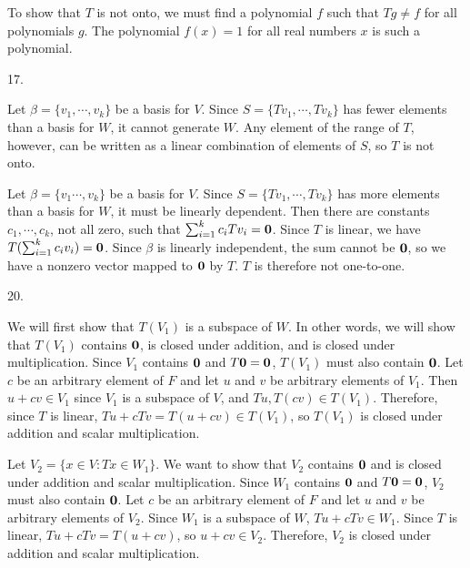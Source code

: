 To show that $T$ is not onto, we must find a polynomial $f$
such that $Tg \ne f$ for all polynomials $g$.
The polynomial $f(x) = 1$ for all real numbers $x$
is such a polynomial.
\bigskip
\item{} 17.

Let $\beta = \{v_1, \cdots, v_k\}$ be a basis for $V$.
Since $S = \{Tv_1, \cdots, Tv_k\}$
has fewer elements than a basis for $W$, it cannot generate $W$.
Any element of the range of $T$, however,
can be written as a linear combination of elements of $S$,
so $T$ is not onto.
\medskip
{}

Let $\beta = \{v_1 \cdots, v_k\}$ be a basis for $V$.
Since $S = \{Tv_1, \cdots, Tv_k\}$
has more elements than a basis for $W$, it must be linearly dependent.
Then there are constants $c_1, \cdots, c_k$, not all zero,
such that $\sum _{i = 1} ^k c_i Tv_i = {\bf 0}$.
Since $T$ is linear, we have
$T(\sum _{i = 1} ^k c_i v_i) = {\bf 0}$.
Since $\beta$ is linearly independent, the sum cannot be ${\bf 0}$,
so we have a nonzero vector mapped to ${\bf 0}$ by $T$.
$T$ is therefore not one-to-one.
\bigskip
\item{} 20.

We will first show that $T(V_1)$ is a subspace of $W$.
In other words, we will show that $T(V_1)$
contains ${\bf 0}$, is closed under addition, and
is closed under multiplication.
Since $V_1$ contains ${\bf 0}$ and $T{\bf 0} = {\bf 0}$,
$T(V_1)$ must also contain ${\bf 0}$.
Let $c$ be an arbitrary element of $F$ and
let $u$ and $v$ be arbitrary elements of $V_1$.
Then $u + cv \in V_1$ since $V_1$ is a subspace of $V$,
and $Tu, T(cv) \in T(V_1)$.
Therefore, since $T$ is linear, $Tu + cTv = T(u + cv) \in T(V_1)$,
so $T(V_1)$ is closed under addition and scalar multiplication.

Let $V_2 = \{x \in V : Tx \in W_1\}$.
We want to show that $V_2$ contains ${\bf 0}$
and is closed under addition and scalar multiplication.
Since $W_1$ contains ${\bf 0}$ and $T{\bf 0} = {\bf 0}$,
$V_2$ must also contain ${\bf 0}$.
Let $c$ be an arbitrary element of $F$ and
let $u$ and $v$ be arbitrary elements of $V_2$.
Since $W_1$ is a subspace of $W$, $Tu + cTv \in W_1$.
Since $T$ is linear, $Tu + cTv = T(u + cv)$, so $u + cv \in V_2$.
Therefore, $V_2$ is closed under addition and scalar multiplication.
\bye
